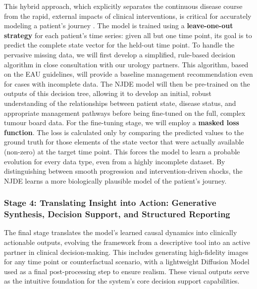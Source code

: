 \documentclass[11pt, a4paper]{article}
\begin{document}
This hybrid approach, which explicitly separates the continuous disease course from the rapid, external impacts of clinical interventions, is critical for accurately modeling a patient's journey \cite{GwakSim2020}. The model is trained using a \textbf{leave-one-out strategy} for each patient's time series: given all but one time point, its goal is to predict the complete state vector for the held-out time point. To handle the pervasive missing data, we will first develop a simplified, rule-based decision algorithm in close consultation with our urology partners. This algorithm, based on the EAU guidelines, will provide a baseline management recommendation even for cases with incomplete data. The NJDE model will then be pre-trained on the outputs of this decision tree, allowing it to develop an initial, robust understanding of the relationships between patient state, disease status, and appropriate management pathways before being fine-tuned on the full, complex tumour board data. For the fine-tuning stage, we will employ a \textbf{masked loss function}. The loss is calculated only by comparing the predicted values to the ground truth for those elements of the state vector that were actually available (non-zero) at the target time point. This forces the model to learn a probable evolution for every data type, even from a highly incomplete dataset. By distinguishing between smooth progression and intervention-driven shocks, the NJDE learns a more biologically plausible model of the patient's journey.

\subsubsection{Stage 4: Translating Insight into Action: Generative Synthesis, Decision Support, and Structured Reporting}
The final stage translates the model's learned causal dynamics into clinically actionable outputs, evolving the framework from a descriptive tool into an active partner in clinical decision-making. This includes generating high-fidelity images for any time point or counterfactual scenario, with a lightweight Diffusion Model used as a final post-processing step to ensure realism. These visual outputs serve as the intuitive foundation for the system's core decision support capabilities.
\end{document}
